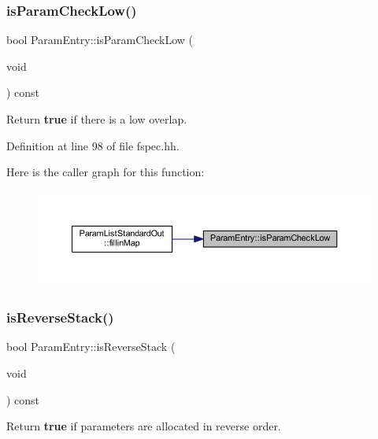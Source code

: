 \subsubsection{\texorpdfstring{isParamCheckLow()}{isParamCheckLow()}}
{\footnotesize\ttfamily bool Param\+Entry\+::is\+Param\+Check\+Low (\begin{DoxyParamCaption}\item[{void}]{ }\end{DoxyParamCaption}) const\hspace{0.3cm}{\ttfamily [inline]}}



Return {\bfseries{true}} if there is a low overlap. 



Definition at line 98 of file fspec.\+hh.

Here is the caller graph for this function\+:
\nopagebreak
\begin{figure}[H]
\begin{center}
\leavevmode
\includegraphics[width=350pt]{class_param_entry_a7dd16288914ec41f8936095d74d943f1_icgraph}
\end{center}
\end{figure}
\mbox{\label{class_param_entry_a9bacf2dac015159e70a62bb611abe0f4}} 
\subsubsection{\texorpdfstring{isReverseStack()}{isReverseStack()}}
{\footnotesize\ttfamily bool Param\+Entry\+::is\+Reverse\+Stack (\begin{DoxyParamCaption}\item[{void}]{ }\end{DoxyParamCaption}) const\hspace{0.3cm}{\ttfamily [inline]}}



Return {\bfseries{true}} if parameters are allocated in reverse order. 



